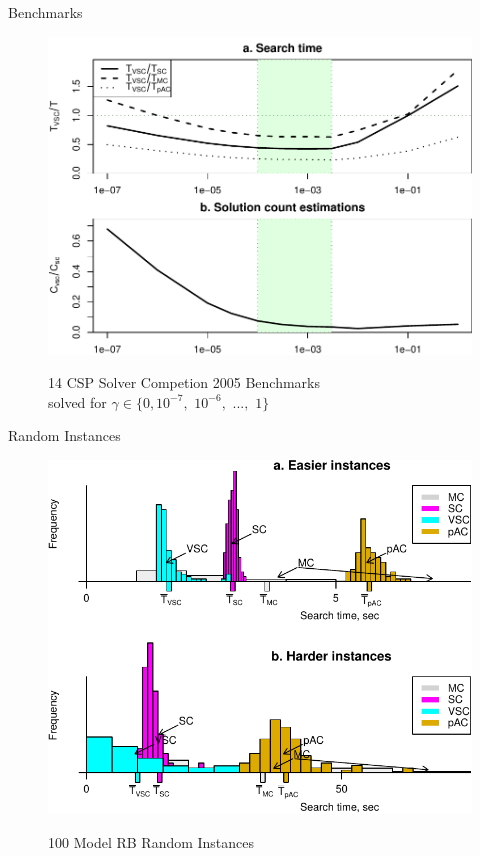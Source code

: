\documentclass{beamer}
\begin{document}
\begin{frame}{Benchmarks}
\vspace{-24pt}
\begin{figure}[h]
\centering
\includegraphics[scale=0.6]{benchmarks.pdf}

14 CSP Solver Competion 2005 Benchmarks\\
solved for $\gamma \in \{0, 10^{-7},$ $10^{-6},$ $...,$ $1\}$
\end{figure}
\end{frame}


\begin{frame}{Random Instances}
\begin{figure}[h] 
\centering
\includegraphics[scale=0.6]{random-problems-arrows+legend.pdf}

100 Model RB Random Instances
\end{figure}
\end{frame}
\end{document}

